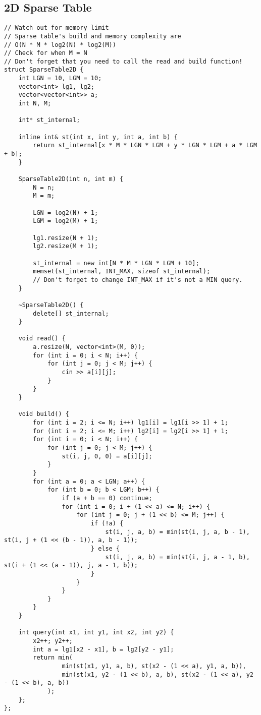 \newpage

\subsection{2D Sparse Table}

\cite{ShahjalalShohag2022Dec}

\begin{lstlisting}
// Watch out for memory limit
// Sparse table's build and memory complexity are
// O(N * M * log2(N) * log2(M))
// Check for when M = N
// Don't forget that you need to call the read and build function!
struct SparseTable2D {
    int LGN = 10, LGM = 10;
    vector<int> lg1, lg2;
    vector<vector<int>> a;
    int N, M;

    int* st_internal;

    inline int& st(int x, int y, int a, int b) {
        return st_internal[x * M * LGN * LGM + y * LGN * LGM + a * LGM + b];
    }

    SparseTable2D(int n, int m) {
        N = n;
        M = m;

        LGN = log2(N) + 1;
        LGM = log2(M) + 1;
        
        lg1.resize(N + 1);
        lg2.resize(M + 1);

        st_internal = new int[N * M * LGN * LGM + 10];
        memset(st_internal, INT_MAX, sizeof st_internal);
        // Don't forget to change INT_MAX if it's not a MIN query.
    }

    ~SparseTable2D() {
        delete[] st_internal;
    }

    void read() {
        a.resize(N, vector<int>(M, 0));
        for (int i = 0; i < N; i++) {
            for (int j = 0; j < M; j++) {
                cin >> a[i][j];
            }
        }
    }

    void build() {
        for (int i = 2; i <= N; i++) lg1[i] = lg1[i >> 1] + 1;
        for (int i = 2; i <= M; i++) lg2[i] = lg2[i >> 1] + 1;
        for (int i = 0; i < N; i++) {
            for (int j = 0; j < M; j++) {
                st(i, j, 0, 0) = a[i][j];
            }
        }
        for (int a = 0; a < LGN; a++) {
            for (int b = 0; b < LGM; b++) {
                if (a + b == 0) continue;
                for (int i = 0; i + (1 << a) <= N; i++) {
                    for (int j = 0; j + (1 << b) <= M; j++) {
                        if (!a) {
                            st(i, j, a, b) = min(st(i, j, a, b - 1), st(i, j + (1 << (b - 1)), a, b - 1));
                        } else {
                            st(i, j, a, b) = min(st(i, j, a - 1, b), st(i + (1 << (a - 1)), j, a - 1, b));
                        }
                    }
                }
            }
        }
    }

    int query(int x1, int y1, int x2, int y2) {
        x2++; y2++;
        int a = lg1[x2 - x1], b = lg2[y2 - y1];
        return min(
                min(st(x1, y1, a, b), st(x2 - (1 << a), y1, a, b)),
                min(st(x1, y2 - (1 << b), a, b), st(x2 - (1 << a), y2 - (1 << b), a, b))
            );
    };
};
\end{lstlisting}

